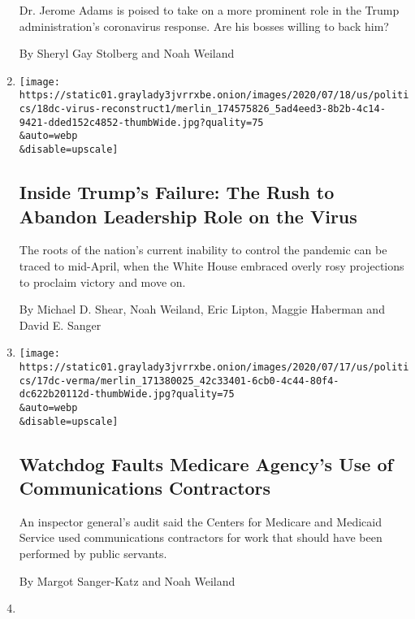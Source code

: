 \begin{enumerate}
  Dr. Jerome Adams is poised to take on a more prominent role in the
  Trump administration's coronavirus response. Are his bosses willing to
  back him?

  By Sheryl Gay Stolberg and Noah Weiland
\item
  \href{/2020/07/18/us/politics/trump-coronavirus-response-failure-leadership.html}{}

  \texttt{[image: https://static01.graylady3jvrrxbe.onion/images/2020/07/18/us/politics/18dc-virus-reconstruct1/merlin\_174575826\_5ad4eed3-8b2b-4c14-9421-dded152c4852-thumbWide.jpg?quality=75\\\&auto=webp\\\&disable=upscale]}

  \hypertarget{inside-trumps-failure-the-rush-to-abandon-leadership-role-on-the-virus}{%
  \subsection{Inside Trump's Failure: The Rush to Abandon Leadership
  Role on the
  Virus}\label{inside-trumps-failure-the-rush-to-abandon-leadership-role-on-the-virus}}

  The roots of the nation's current inability to control the pandemic
  can be traced to mid-April, when the White House embraced overly rosy
  projections to proclaim victory and move on.

  By Michael D. Shear, Noah Weiland, Eric Lipton, Maggie Haberman and
  David E. Sanger
\item
  \href{/2020/07/17/us/politics/medicare-agency-inspector-general.html}{}

  \texttt{[image: https://static01.graylady3jvrrxbe.onion/images/2020/07/17/us/politics/17dc-verma/merlin\_171380025\_42c33401-6cb0-4c44-80f4-dc622b20112d-thumbWide.jpg?quality=75\\\&auto=webp\\\&disable=upscale]}

  \hypertarget{watchdog-faults-medicare-agencys-use-of-communications-contractors}{%
  \subsection{Watchdog Faults Medicare Agency's Use of Communications
  Contractors}\label{watchdog-faults-medicare-agencys-use-of-communications-contractors}}

  An inspector general's audit said the Centers for Medicare and
  Medicaid Service used communications contractors for work that should
  have been performed by public servants.

  By Margot Sanger-Katz and Noah Weiland
\item
  \href{/2020/07/15/us/politics/vaccine-Slaoui-coronavirus-trump.html}{}


\end{enumerate}

